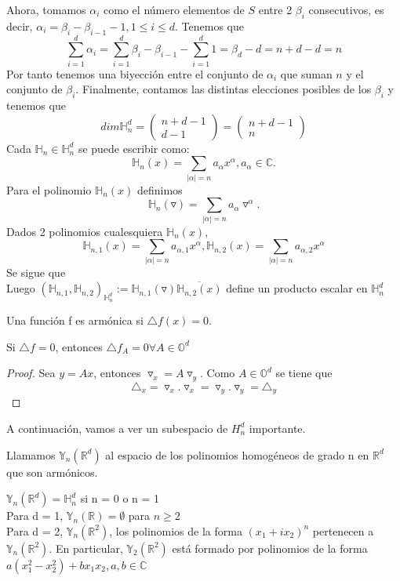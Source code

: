 Ahora, tomamos $\alpha_i$ como el número elementos de $S$ entre 2 $\beta_i$ consecutivos, es decir, $ \alpha_i =  \beta_i - \beta_{i-1} - 1,  1\leq i \leq d$. Tenemos que $$
\sum_{i=1}^{d} \alpha_i = \sum_{i=1}^{d} \beta_i - \beta_{i-1} - \sum_{i=1}^{d} 1 = \beta_d - d = n+d-d = n
$$
Por tanto tenemos una biyección entre el conjunto de $\alpha_i$ que suman $n$ y el conjunto de $\beta_i$. Finalmente, contamos las distintas elecciones posibles de los $\beta_i$ y tenemos que
$$
dim \mathds{H}^d_n = \begin{pmatrix}
n+d-1 \\
d-1
\end{pmatrix} = \begin{pmatrix}
n+d-1 \\
n
\end{pmatrix}
$$
Cada $\mathds{H}_n \in \mathds{H}^d_n$ se puede escribir como:
$$
	\mathds{H}_n(x) = \sum_{|\alpha| = n } a_\alpha x^\alpha ,   a_\alpha \in \mathds{C}.
$$
Para el polinomio $	\mathds{H}_n(x)$ definimos
$$
		\mathds{H}_n(\triangledown) = \sum_{|\alpha| = n } a_\alpha \triangledown^\alpha.
$$
Dados 2 polinomios cualesquiera $\mathds{H}_n(x)$,
$$
\mathds{H}_{n,1}(x) =  \sum_{|\alpha| = n } a_{\alpha,1} x^\alpha ,		\mathds{H}_{n,2}(x) =  \sum_{|\alpha| = n } a_{\alpha,2} x^\alpha   
$$
Se sigue que 
$$
$$
Luego $(\mathds{H}_{n,1},\mathds{H}_{n,2})_{\mathds{H}_n^d} := \mathds{H}_{n,1}(\triangledown)\overline{\mathds{H}_{n,2}(x)}$ define un producto escalar en $\mathds{H}_n^d$
\begin{defn}
Una función f es armónica si $\triangle f (x) = 0$. 
\end{defn}
\begin{lem}
	Si $\triangle f = 0$, entonces $\triangle f_A = 0   \forall A \in \mathds{O}^d$
\end{lem}
\begin{proof}
	Sea $ y = Ax$, entonces $\triangledown_x = A \triangledown_y$. Como $ A \in \mathds{O}^d$ se tiene que 
	$$
	\triangle_x = \triangledown_x . \triangledown_x = \triangledown_y . \triangledown_y = \triangle_y
	$$ 
\end{proof}
A continuación, vamos a ver un subespacio de $H^d_n$ importante.
\begin{defn}
Llamamos $\mathds{Y}_n(\mathds{R}^d)$ al espacio de los polinomios homogéneos de grado n en $\mathds{R}^d$ que son armónicos.
\end{defn}
\begin{example}
$\mathds{Y}_n(\mathds{R}^d) = \mathds{H}^d_n$ si n = 0 o n = 1\\
Para d = 1, $\mathds{Y}_n(\mathds{R})=\emptyset$ para $n\ge 2$\\
Para d = 2, $\mathds{Y}_n(\mathds{R}^2)$, los polinomios de la forma $(x_1 + ix_2) ^n$ pertenecen a $\mathds{Y}_n(\mathds{R}^2).$ En particular,  $\mathds{Y}_2(\mathds{R}^2)$ está formado por polinomios de la forma $a(x_1^2-x_2^2)+bx_1x_2,		a,b\in\mathds{C}$
\end{example} 
